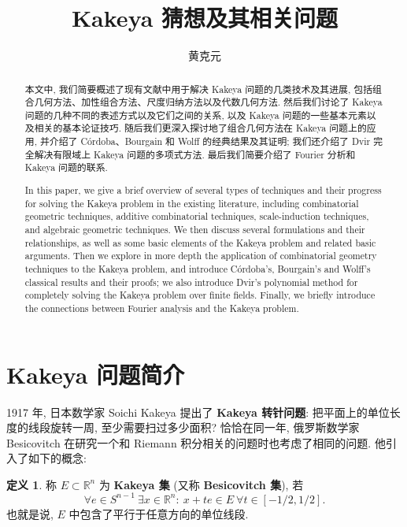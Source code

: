 \documentclass[a4paper]{article}
\numberwithin{equation}{section}
\numberwithin{figure}{section}
\numberwithin{table}{section}
\theoremstyle{definition}
\newtheorem*{definition}{\indent 定义}
\newcommand{\R}{\mathbb{R}}
\begin{document}
\title{Kakeya 猜想及其相关问题}
\author{黄克元}
\date{}
\maketitle

\begin{abstract}
    本文中, 我们简要概述了现有文献中用于解决 Kakeya 问题的几类技术及其进展, 包括组合几何方法、加性组合方法、尺度归纳方法以及代数几何方法. 然后我们讨论了 Kakeya 问题的几种不同的表述方式以及它们之间的关系, 以及 Kakeya 问题的一些基本元素以及相关的基本论证技巧. 随后我们更深入探讨地了组合几何方法在 Kakeya 问题上的应用, 并介绍了 C\'ordoba、Bourgain 和 Wolff 的经典结果及其证明; 我们还介绍了 Dvir 完全解决有限域上 Kakeya 问题的多项式方法. 最后我们简要介绍了 Fourier 分析和 Kakeya 问题的联系.
\end{abstract}

\begin{otherlanguage}{english}
\begin{abstract}
    In this paper, we give a brief overview of several types of techniques and their progress for solving the Kakeya problem in the existing literature, including combinatorial geometric techniques, additive combinatorial techniques, scale-induction techniques, and algebraic geometric techniques. We then discuss several formulations and their relationships, as well as some basic elements of the Kakeya problem and related basic arguments. Then we explore in more depth the application of combinatorial geometry techniques to the Kakeya problem, and introduce C\'ordoba's, Bourgain's and Wolff's classical results and their proofs; we also introduce Dvir's polynomial method for completely solving the Kakeya problem over finite fields. Finally, we briefly introduce the connections between Fourier analysis and the Kakeya problem.
\end{abstract}
\end{otherlanguage}

\section{Kakeya 问题简介}

1917 年, 日本数学家 Soichi Kakeya 提出了 \textbf{Kakeya 转针问题}: 把平面上的单位长度的线段旋转一周, 至少需要扫过多少面积? 恰恰在同一年, 俄罗斯数学家 Besicovitch 在研究一个和 Riemann 积分相关的问题时也考虑了相同的问题. 他引入了如下的概念:

\begin{definition}
    称 $E\subset\R^n$ 为 \textbf{Kakeya 集} (又称 \textbf{Besicovitch 集}), 若 
    \begin{equation*}
        \forall e\in S^{n-1}\ \exists x\in\R^n:\ x+te\in E\ \forall t\in [-1/2, 1/2].
    \end{equation*}
    也就是说, $E$ 中包含了平行于任意方向的单位线段.
\end{definition}
\end{document}
